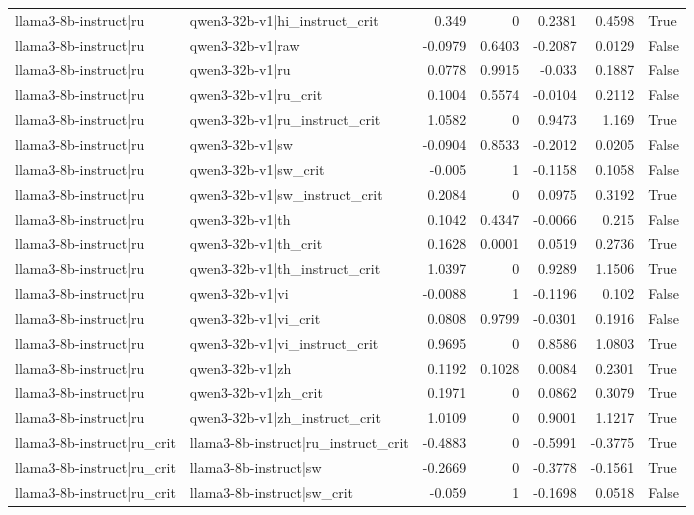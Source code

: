 \begin{table}
\begin{tabular}{l l r r r r l}
llama3-8b-instruct|ru & qwen3-32b-v1|hi_instruct_crit & 0.349 & 0 & 0.2381 & 0.4598 & True \\
llama3-8b-instruct|ru & qwen3-32b-v1|raw & -0.0979 & 0.6403 & -0.2087 & 0.0129 & False \\
llama3-8b-instruct|ru & qwen3-32b-v1|ru & 0.0778 & 0.9915 & -0.033 & 0.1887 & False \\
llama3-8b-instruct|ru & qwen3-32b-v1|ru_crit & 0.1004 & 0.5574 & -0.0104 & 0.2112 & False \\
llama3-8b-instruct|ru & qwen3-32b-v1|ru_instruct_crit & 1.0582 & 0 & 0.9473 & 1.169 & True \\
llama3-8b-instruct|ru & qwen3-32b-v1|sw & -0.0904 & 0.8533 & -0.2012 & 0.0205 & False \\
llama3-8b-instruct|ru & qwen3-32b-v1|sw_crit & -0.005 & 1 & -0.1158 & 0.1058 & False \\
llama3-8b-instruct|ru & qwen3-32b-v1|sw_instruct_crit & 0.2084 & 0 & 0.0975 & 0.3192 & True \\
llama3-8b-instruct|ru & qwen3-32b-v1|th & 0.1042 & 0.4347 & -0.0066 & 0.215 & False \\
llama3-8b-instruct|ru & qwen3-32b-v1|th_crit & 0.1628 & 0.0001 & 0.0519 & 0.2736 & True \\
llama3-8b-instruct|ru & qwen3-32b-v1|th_instruct_crit & 1.0397 & 0 & 0.9289 & 1.1506 & True \\
llama3-8b-instruct|ru & qwen3-32b-v1|vi & -0.0088 & 1 & -0.1196 & 0.102 & False \\
llama3-8b-instruct|ru & qwen3-32b-v1|vi_crit & 0.0808 & 0.9799 & -0.0301 & 0.1916 & False \\
llama3-8b-instruct|ru & qwen3-32b-v1|vi_instruct_crit & 0.9695 & 0 & 0.8586 & 1.0803 & True \\
llama3-8b-instruct|ru & qwen3-32b-v1|zh & 0.1192 & 0.1028 & 0.0084 & 0.2301 & True \\
llama3-8b-instruct|ru & qwen3-32b-v1|zh_crit & 0.1971 & 0 & 0.0862 & 0.3079 & True \\
llama3-8b-instruct|ru & qwen3-32b-v1|zh_instruct_crit & 1.0109 & 0 & 0.9001 & 1.1217 & True \\
llama3-8b-instruct|ru_crit & llama3-8b-instruct|ru_instruct_crit & -0.4883 & 0 & -0.5991 & -0.3775 & True \\
llama3-8b-instruct|ru_crit & llama3-8b-instruct|sw & -0.2669 & 0 & -0.3778 & -0.1561 & True \\
llama3-8b-instruct|ru_crit & llama3-8b-instruct|sw_crit & -0.059 & 1 & -0.1698 & 0.0518 & False \\

\end{tabular}
\end{table}
